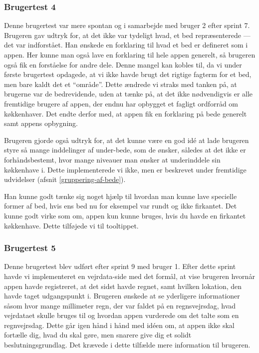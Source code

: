 \subsubsection{Brugertest 4}
Denne brugertest var mere spontan og i samarbejde med bruger 2 efter sprint 7. Brugeren gav udtryk for, at det ikke var tydeligt hvad, et bed repræsenterede --- det var indforstået. Han ønskede en forklaring til hvad et bed er defineret som i appen. Her kunne man også lave en forklaring til hele appen generelt, så brugeren også fik en forståelse for andre dele. Denne mangel kan kobles til, da vi under første brugertest opdagede, at vi ikke havde brugt det rigtige fagterm for et bed, men bare kaldt det et ``område''. Dette ændrede vi straks med tanken på, at brugerne var de bedrevidende, uden at tænke på, at det ikke nødvendigvis er alle fremtidige brugere af appen, der endnu har opbygget et fagligt ordforråd om køkkenhaver. Det endte derfor med, at appen fik en forklaring på bede generelt samt appens opbygning.

Brugeren gjorde også udtryk for, at det kunne være en god idé at lade brugeren styre så mange inddelinger af under-bede, som de ønsker, således at det ikke er forhåndsbestemt, hvor mange niveauer man ønsker at underinddele sin køkkenhave i. Dette implementerede vi ikke, men er beskrevet under fremtidige udvidelser (afsnit \ref{gruppering-af-bede}).

Han kunne godt tænke sig noget hjælp til hvordan man kunne lave specielle former af bed, hvis ens bed nu for eksempel var rundt og ikke firkantet. Det kunne godt virke som om, appen kun kunne bruges, hvis du havde en firkantet køkkenhave. Dette tilføjede vi til tooltippet.

\subsubsection{Brugertest 5}
Denne brugertest blev udført efter sprint 9 med bruger 1. Efter dette sprint havde vi implementeret en vejrdata-side med det formål, at vise brugeren hvornår appen havde registreret, at det sidst havde regnet, samt hvilken lokation, den havde taget udgangspunkt i. Brugeren ønskede at se yderligere informationer såsom hvor mange millimeter regn, der var faldet på en regnsvejrsdag, hvad vejrdataet skulle bruges til og hvordan appen vurderede om det talte som en regnvejrsdag. Dette går igen hånd i hånd med idéen om, at appen ikke skal fortælle dig, hvad du skal gøre, men snarere give dig et solidt beslutningsgrundlag. Det krævede i dette tilfælde mere information til brugeren.

